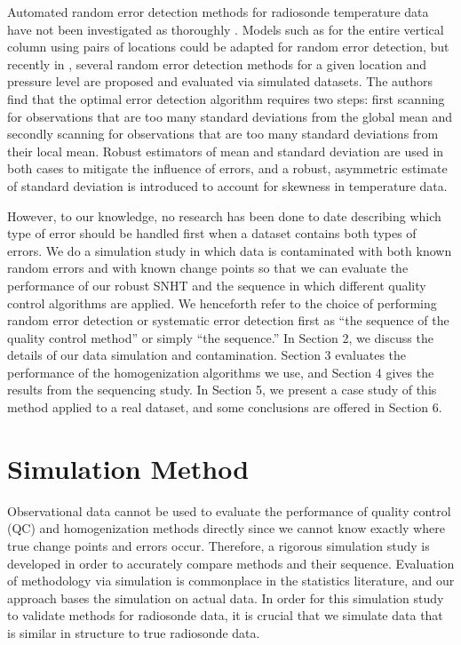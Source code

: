\documentclass[12pt]{article}
\begin{document}
\begin{doublespacing}
Automated random error detection methods for radiosonde temperature data have not been investigated as thoroughly \cite{durre06,lanzante96}.  Models such as \cite{ignaccolo14} for  the entire vertical column using pairs of locations could be adapted for random error detection, but  recently in \cite{bell14}, several random error detection methods for a given location and pressure level are proposed and evaluated via simulated datasets.  The authors find that the optimal error detection algorithm requires two steps: first scanning for observations that are too many standard deviations from the global mean and secondly scanning for observations that are too many standard deviations from their local mean.  Robust estimators of mean and standard deviation are used in both cases to mitigate the influence of errors, and a robust, asymmetric estimate of standard deviation is introduced to account for skewness in temperature data.

However, to our knowledge, no research has been done to date describing which type of error should be handled first when a dataset contains both types of errors.  We do a simulation study in which data is contaminated with both known random errors and with known change points so that we can  evaluate the performance of our robust SNHT and the sequence in which different quality control algorithms are applied.  We henceforth refer to the choice of performing random error detection or systematic error detection first  as ``the sequence of the quality control method'' or simply ``the sequence.''  In Section 2, we discuss the details of our data simulation and contamination.  Section 3 evaluates the performance of the homogenization algorithms we use, and Section 4 gives the results from the sequencing study.  In Section 5, we present a case study of this method applied to a real dataset, and some conclusions are offered in Section 6.

\section{Simulation Method}
Observational data cannot be used to evaluate the performance of quality control (QC) and homogenization methods directly since we cannot know exactly where true change points and errors occur.  Therefore, a rigorous simulation study is developed in order to accurately compare methods and their sequence.  Evaluation of methodology via simulation is commonplace in the statistics literature, and our approach bases the simulation on actual data.  In order for this simulation study to validate methods for radiosonde data, it is crucial that we simulate data that is similar in structure to true radiosonde data.


\end{doublespacing}
\end{document}
